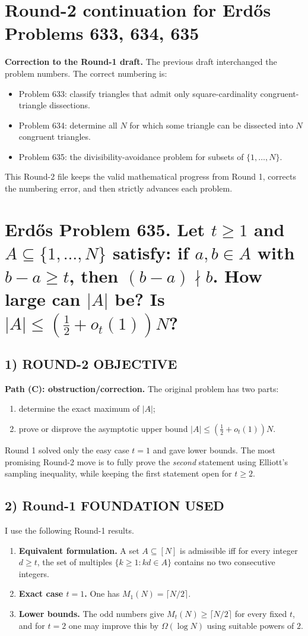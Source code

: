 \section*{Round-2 continuation for Erd\H{o}s Problems 633, 634, 635}

\noindent\textbf{Correction to the Round-1 draft.} The previous draft interchanged the problem numbers. The correct numbering is:
\begin{itemize}
\item Problem 633: classify triangles that admit only square-cardinality congruent-triangle dissections.
\item Problem 634: determine all $N$ for which some triangle can be dissected into $N$ congruent triangles.
\item Problem 635: the divisibility-avoidance problem for subsets of $\{1,\dots,N\}$.
\end{itemize}
This Round-2 file keeps the valid mathematical progress from Round 1, corrects the numbering error, and then strictly advances each problem.

\section*{Erd\H{o}s Problem 635. Let $t\ge 1$ and $A\subseteq\{1,\dots,N\}$ satisfy: if $a,b\in A$ with $b-a\ge t$, then $(b-a)\nmid b$. How large can $|A|$ be? Is $|A|\le (\tfrac12+o_t(1))N$?}

\subsection*{1) ROUND-2 OBJECTIVE}
\textbf{Path (C): obstruction/correction.} The original problem has two parts:
\begin{enumerate}
\item determine the exact maximum of $|A|$;
\item prove or disprove the asymptotic upper bound $|A|\le (\frac12+o_t(1))N$.
\end{enumerate}
Round 1 solved only the easy case $t=1$ and gave lower bounds. The most promising Round-2 move is to fully prove the \emph{second} statement using Elliott's sampling inequality, while keeping the first statement open for $t\ge 2$.

\subsection*{2) Round-1 FOUNDATION USED}
I use the following Round-1 results.
\begin{enumerate}
\item \textbf{Equivalent formulation.} A set $A\subseteq [N]$ is admissible iff for every integer $d\ge t$, the set of multiples $\{k\ge 1: kd\in A\}$ contains no two consecutive integers.
\item \textbf{Exact case $t=1$.} One has $M_1(N)=\lceil N/2\rceil$.
\item \textbf{Lower bounds.} The odd numbers give $M_t(N)\ge \lceil N/2\rceil$ for every fixed $t$, and for $t=2$ one may improve this by $\Omega(\log N)$ using suitable powers of $2$.
\end{enumerate}

